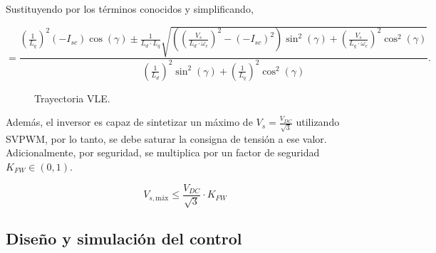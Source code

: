 Sustituyendo por los términos conocidos y simplificando,

\begin{equation}
	=\frac{\left(\frac{1}{L_q}\right)^2\left(-I_{s c}\right) \cos (\gamma) \pm \frac{1}{L_d \cdot L_q} \sqrt{\left(\left(\frac{V_s}{L_d \cdot \omega_e}\right)^2-\left(-I_{s c}\right)^2\right) \sin ^2(\gamma)+\left(\frac{V_s}{L_q \cdot \omega_e}\right)^2 \cos ^2(\gamma)}}{\left(\frac{1}{L_d}\right)^2 \sin ^2(\gamma)+\left(\frac{1}{L_q}\right)^2 \cos ^2(\gamma)} \text{.}
\end{equation}


\begin{figure}[H]
  \centering
  \caption{Trayectoria VLE.}
\end{figure}



Además, el inversor es capaz de sintetizar un máximo de $V_s = \frac{V_{DC}}{\sqrt{3}}$ utilizando SVPWM, por lo tanto, se debe saturar la consigna de tensión a ese valor. Adicionalmente, por seguridad, se multiplica por un factor de seguridad $K_{FW} \in (0,1)$.

\begin{equation}
	V_{s,\text{máx}} \leq \frac{V_{DC}}{\sqrt{3}}\cdot K_{FW}
\end{equation}

\subsection{Diseño y simulación del control}

